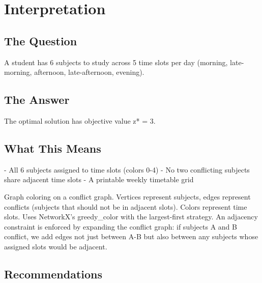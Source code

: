 \documentclass[11pt, a4paper]{article}
\begin{document}
\section{Interpretation}

\subsection{The Question}
A student has 6 subjects to study across 5 time slots per day (morning, late-morning, afternoon, late-afternoon, evening).

\subsection{The Answer}

\begin{polyainsight}[title={Bottom Line}]
The optimal solution has objective value z* = 3.
\end{polyainsight}

\subsection{What This Means}

- All 6 subjects assigned to time slots (colors 0-4)
- No two conflicting subjects share adjacent time slots
- A printable weekly timetable grid

Graph coloring on a conflict graph. Vertices represent subjects, edges represent conflicts (subjects that should not be in adjacent slots). Colors represent time slots. Uses NetworkX's greedy\_color with the largest-first strategy. An adjacency constraint is enforced by expanding the conflict graph: if subjects A and B conflict, we add edges not just between A-B but also between any subjects whose assigned slots would be adjacent.



\subsection{Recommendations}
\end{document}
